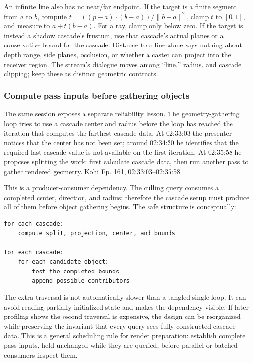 An infinite line also has no near/far endpoint. If the target is a finite segment from \(a\) to \(b\), compute \(t=((p-a)\cdot(b-a))/\|b-a\|^2\), clamp \(t\) to \([0,1]\), and measure to \(a+t(b-a)\). For a ray, clamp only below zero. If the target is instead a shadow cascade's frustum, use that cascade's actual planes or a conservative bound for the cascade. Distance to a line alone says nothing about depth range, side planes, occlusion, or whether a caster can project into the receiver region. The stream's dialogue moves among ``line,'' radius, and cascade clipping; keep these as distinct geometric contracts.

\subsubsection{Compute pass inputs before gathering objects}\label{04-visual-computing-ii-ch028-compute-pass-inputs-before-gathering-objects}

\hypertarget{04-visual-computing-ii-ch028-compute-pass-inputs-before-gathering-objects}{}

The same session exposes a separate reliability lesson. The geometry-gathering loop tries to use a cascade center and radius before the loop has reached the iteration that computes the farthest cascade data. At 02:33:03 the presenter notices that the center has not been set; around 02:34:20 he identifies that the required last-cascade value is not available on the first iteration. At 02:35:58 he proposes splitting the work: first calculate cascade data, then run another pass to gather rendered geometry. \href{https://www.youtube.com/watch?v=dJYWL9YAelY&t=9183s}{Kohi Ep. 161, 02:33:03--02:35:58}

This is a producer-consumer dependency. The culling query consumes a completed center, direction, and radius; therefore the cascade setup must produce all of them before object gathering begins. The safe structure is conceptually:

\begin{verbatim}
for each cascade:
    compute split, projection, center, and bounds

for each cascade:
    for each candidate object:
        test the completed bounds
        append possible contributors
\end{verbatim}

The extra traversal is not automatically slower than a tangled single loop. It can avoid reading partially initialized state and makes the dependency visible. If later profiling shows the second traversal is expensive, the design can be reorganized while preserving the invariant that every query sees fully constructed cascade data. This is a general scheduling rule for render preparation: establish complete pass inputs, held unchanged while they are queried, before parallel or batched consumers inspect them.

